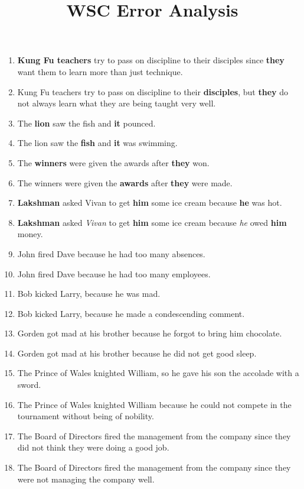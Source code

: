 \documentclass{article}
\begin{document}
\title{WSC Error Analysis}
\maketitle

\begin{enumerate}
\item {\bf Kung Fu teachers} try to pass on discipline to their disciples since {\bf they} want them to learn more than just technique.
\item Kung Fu teachers try to pass on discipline to their {\bf disciples}, but {\bf they} do not always learn what they are being taught very well.
\item The {\bf lion} saw the fish and {\bf it} pounced.
\item The lion saw the {\bf fish} and {\bf it} was swimming.
\item The {\bf winners} were given the awards after {\bf they} won.
\item The winners were given the {\bf awards} after {\bf they} were made.
\item {\bf Lakshman} asked Vivan to get {\bf him} some ice cream because {\bf he} was hot.
\item {\bf Lakshman} asked {\it Vivan} to get {\bf him} some ice cream because {\it he} owed {\bf him} money.
\item John fired Dave because he had too many absences.
\item John fired Dave because he had too many employees.
\item Bob kicked Larry, because he was mad.
\item Bob kicked Larry, because he made a condescending comment.
\item Gorden got mad at his brother because he forgot to bring him chocolate.
\item Gorden got mad at his brother because he did not get good sleep.
\item The Prince of Wales knighted William, so he gave his son the accolade with a sword.
\item The Prince of Wales knighted William because he could not compete in the tournament without being of nobility.
\item The Board of Directors fired the management from the company since they did not think they were doing a good job.
\item The Board of Directors fired the management from the company since they were not managing the company well.

\end{enumerate}
\end{document}
